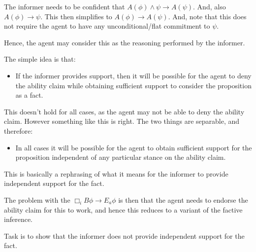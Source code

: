 \documentclass[10pt]{article}
\newcommand{\hozlinedash}[0]{%
  \noindent\hdashrule[0.5ex][c]{\textwidth}{.1pt}{2.5pt}
}
\begin{document}
\begin{note}
  The informer needs to be confident that \(A(\phi) \land \psi \rightarrow A(\psi)\).
  And, also \(A(\phi) \rightarrow \psi\).
  This then simplifies to \(A(\phi) \rightarrow A(\psi)\).
  And, note that this does not require the agent to have any unconditional/flat commitment to \(\psi\).

  Hence, the agent may consider this as the reasoning performed by the informer.
\end{note}

\hozlinedash

\begin{note}
  The simple idea is that:
  \begin{itemize}
  \item If the informer provides support, then it will be possible for the agent to deny the ability claim while obtaining sufficient support to consider the proposition as a fact.
  \end{itemize}
  This doesn't hold for all cases, as the agent may not be able to deny the ability claim.
  However something like this is right.
  The two things are separable, and therefore:
  \begin{itemize}
  \item In all cases it will be possible for the agent to obtain sufficient support for the proposition independent of any particular stance on the ability claim.
  \end{itemize}
  This is basically a rephrasing of what it means for the informer to provide independent support for the fact.

  The problem with the \(\Box_{i} B \phi \rightarrow E_{a}\phi\) is then that the agent needs to endorse the ability claim for this to work, and hence this reduces to a variant of the factive inference.
\end{note}

Task is to show that the informer does not provide independent support for the fact.
\end{document}
